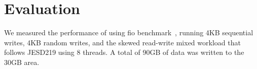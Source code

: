 \section{Evaluation}
We measured the performance of \ours{} using fio benchmark~\cite{fio-bench},
running 4KB sequential writes, 4KB random writes, and the skewed read-write
mixed workload that follows JESD219 using 8 threads.  A total of 90GB of data
was written to the 30GB area.

